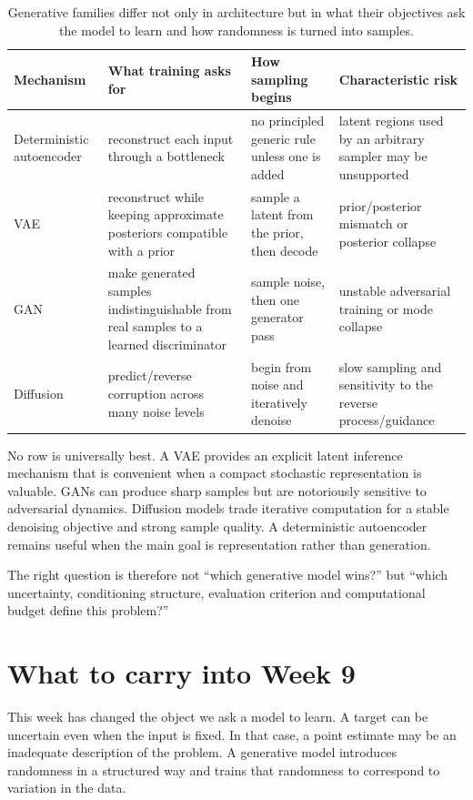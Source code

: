 \begin{table}[ht]
\centering
\small
\begin{tabular}{p{}p{}p{}p{}}
\toprule
Mechanism & What training asks for & How sampling begins & Characteristic risk \\
\midrule
Deterministic autoencoder & reconstruct each input through a bottleneck & no principled generic rule unless one is added & latent regions used by an arbitrary sampler may be unsupported \\
VAE & reconstruct while keeping approximate posteriors compatible with a prior & sample a latent from the prior, then decode & prior/posterior mismatch or posterior collapse \\
GAN & make generated samples indistinguishable from real samples to a learned discriminator & sample noise, then one generator pass & unstable adversarial training or mode collapse \\
Diffusion & predict/reverse corruption across many noise levels & begin from noise and iteratively denoise & slow sampling and sensitivity to the reverse process/guidance \\
\bottomrule
\end{tabular}
\caption{Generative families differ not only in architecture but in what their objectives ask the model to learn and how randomness is turned into samples.}
\label{tab:week8-generative-families}
\end{table}

No row is universally best. A VAE provides an explicit latent inference mechanism that is convenient when a compact stochastic representation is valuable. GANs can produce sharp samples but are notoriously sensitive to adversarial dynamics. Diffusion models trade iterative computation for a stable denoising objective and strong sample quality. A deterministic autoencoder remains useful when the main goal is representation rather than generation.

The right question is therefore not ``which generative model wins?'' but ``which uncertainty, conditioning structure, evaluation criterion and computational budget define this problem?''

\section{What to carry into Week 9}

This week has changed the object we ask a model to learn. A target can be uncertain even when the input is fixed. In that case, a point estimate may be an inadequate description of the problem. A generative model introduces randomness in a structured way and trains that randomness to correspond to variation in the data.

